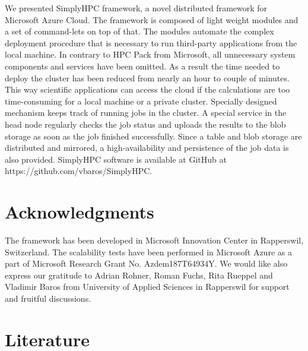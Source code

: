 \documentclass[3p,times]{elsarticle}
\begin{document}
We presented SimplyHPC framework, a novel distributed framework for Microsoft Azure Cloud. The framework is composed of light weight modules and a set of command-lets on top of that. The modules automate the complex deployment procedure that is necessary to run third-party applications from the local machine. In contrary to HPC Pack from Microsoft, all unnecessary system components and services have been omitted. As a result the time needed to deploy the cluster has been reduced from nearly an hour to couple of minutes.  This way scientific applications can access the cloud if the calculations are too time-consuming for a local machine or a private cluster. Specially designed mechanism keeps track of running jobs in the cluster. A special service in the head node regularly checks the job status and uploads the results to the blob storage as soon as the job finished successfully. Since a table and blob storage are distributed and mirrored, a high-availability and persistence of the job data is also provided. SimplyHPC software is available at GitHub at https://github.com/vbaros/SimplyHPC.




\section{Acknowledgments}
\label{sec:ackn}

The framework has been developed in Microsoft Innovation Center in Rapperswil, Switzerland. The scalability tests have been performed in Microsoft Azure as a part of Microsoft Research Grant No. Azdem187T64934Y. We would like also express our gratitude to Adrian Rohner, Roman Fuchs, Rita Rueppel and Vladimir Baros from University of Applied Sciences in Rapperswil for support and fruitful discussions.

\section{Literature}
\label{sec:literature}



\end{document}
